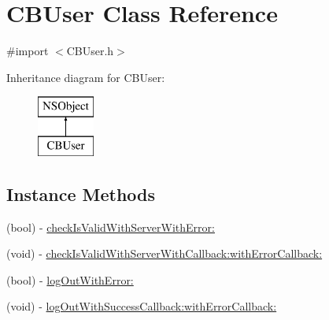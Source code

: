 \hypertarget{interface_c_b_user}{\section{C\+B\+User Class Reference}
\label{interface_c_b_user}
}


{\ttfamily \#import $<$C\+B\+User.\+h$>$}

Inheritance diagram for C\+B\+User\+:\begin{figure}[H]
\begin{center}
\leavevmode
\includegraphics[height=2.000000cm]{interface_c_b_user}
\end{center}
\end{figure}
\subsection*{Instance Methods}
\begin{DoxyCompactItemize}
\item 
(bool) -\/ \hyperlink{interface_c_b_user_a28b25fbf031ecb81c531e6a003ccf766}{check\+Is\+Valid\+With\+Server\+With\+Error\+:}
\item 
(void) -\/ \hyperlink{interface_c_b_user_ab423b6cd05f2db5f6835e886088c83d6}{check\+Is\+Valid\+With\+Server\+With\+Callback\+:with\+Error\+Callback\+:}
\item 
(bool) -\/ \hyperlink{interface_c_b_user_a06f36a7260297c2b191ed2f6e98e43fa}{log\+Out\+With\+Error\+:}
\item 
(void) -\/ \hyperlink{interface_c_b_user_a8deee144e1e7fbc6e1b4c8522a59921e}{log\+Out\+With\+Success\+Callback\+:with\+Error\+Callback\+:}
\end{DoxyCompactItemize}
